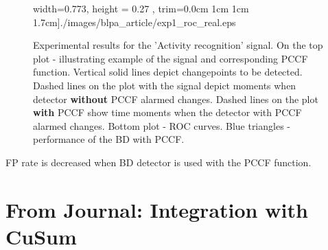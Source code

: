 \begin{figure}[!htb]
\begin{minipage}{0.5\textwidth}
{            width=0.773\textwidth, 
            height = 0.27 \textheight,
            trim={0.0cm 1cm 1cm 1.7cm}]{./images/blpa_article/exp1_roc_real.eps}
            }
        \caption{
         Experimental results for the 'Activity recognition' signal.
         On the top plot - illustrating example of the signal and corresponding PCCF function.
         Vertical solid lines depict changepoints to be detected. 
         Dashed lines on the plot with the signal depict moments when detector \textbf{without} PCCF alarmed changes. 
         Dashed lines on the plot \textbf{with} PCCF show time moments when the detector with PCCF alarmed changes.
         Bottom plot - ROC curves. 
        Blue triangles - performance of the BD with PCCF.
            }
            \label{fig:results2}
    \end{minipage}
\end{figure}
FP rate is decreased when BD detector is used with the PCCF function.

\section{From Journal: Integration with CuSum}
